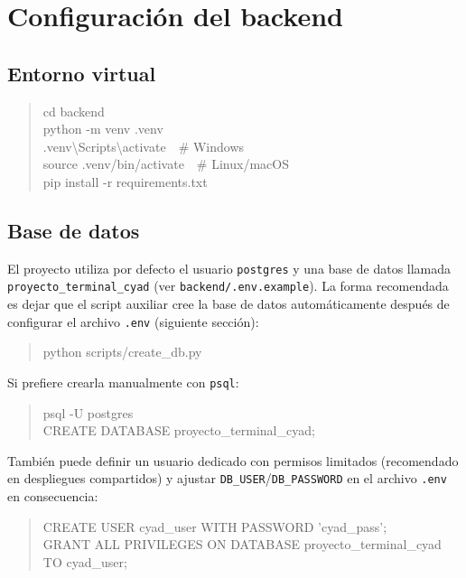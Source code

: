 \documentclass{computacion}
\begin{document}
\section{Configuración del backend}

\subsection{Entorno virtual}

\begin{quote}
\ttfamily
cd backend \\
python -m venv .venv \\
.venv\textbackslash Scripts\textbackslash activate\ \ \# Windows \\
source .venv/bin/activate\ \ \# Linux/macOS \\
pip install -r requirements.txt
\end{quote}

\subsection{Base de datos}

El proyecto utiliza por defecto el usuario \texttt{postgres} y una base de datos llamada \texttt{proyecto\_terminal\_cyad} (ver \texttt{backend/.env.example}). La forma recomendada es dejar que el script auxiliar cree la base de datos automáticamente después de configurar el archivo \texttt{.env} (siguiente sección):

\begin{quote}
\ttfamily
python scripts/create\_db.py
\end{quote}

Si prefiere crearla manualmente con \texttt{psql}:

\begin{quote}
\ttfamily
psql -U postgres \\
CREATE DATABASE proyecto\_terminal\_cyad;
\end{quote}

También puede definir un usuario dedicado con permisos limitados (recomendado en despliegues compartidos) y ajustar \texttt{DB\_USER}/\texttt{DB\_PASSWORD} en el archivo \texttt{.env} en consecuencia:

\begin{quote}
\ttfamily
CREATE USER cyad\_user WITH PASSWORD 'cyad\_pass'; \\
GRANT ALL PRIVILEGES ON DATABASE proyecto\_terminal\_cyad TO cyad\_user;
\end{quote}
\end{document}

